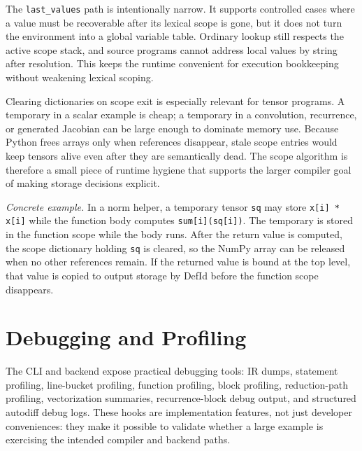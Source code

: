 The \texttt{last\_values} path is intentionally narrow. It supports controlled
cases where a value must be recoverable after its lexical scope is gone, but it
does not turn the environment into a global variable table. Ordinary lookup
still respects the active scope stack, and source programs cannot address local
values by string after resolution. This keeps the runtime convenient for
execution bookkeeping without weakening lexical scoping.

Clearing dictionaries on scope exit is especially relevant for tensor programs.
A temporary in a scalar example is cheap; a temporary in a convolution,
recurrence, or generated Jacobian can be large enough to dominate memory use.
Because Python frees arrays only when references disappear, stale scope entries
would keep tensors alive even after they are semantically dead. The scope
algorithm is therefore a small piece of runtime hygiene that supports the
larger compiler goal of making storage decisions explicit.

\textit{Concrete example.} In a norm helper, a temporary tensor \texttt{sq}
may store \texttt{x[i] * x[i]} while the function body computes
\texttt{sum[i](sq[i])}. The temporary is stored in the function scope while the
body runs. After the return value is computed, the scope dictionary holding
\texttt{sq} is cleared, so the NumPy array can be released when no other
references remain. If the returned value is bound at the top level, that value
is copied to output storage by DefId before the function scope disappears.

\section{Debugging and Profiling}

The CLI and backend expose practical debugging tools: IR dumps, statement
profiling, line-bucket profiling, function profiling, block profiling,
reduction-path profiling, vectorization summaries, recurrence-block debug
output, and structured autodiff debug logs. These hooks are implementation
features, not just developer conveniences: they make it possible to validate
whether a large example is exercising the intended compiler and backend paths.
